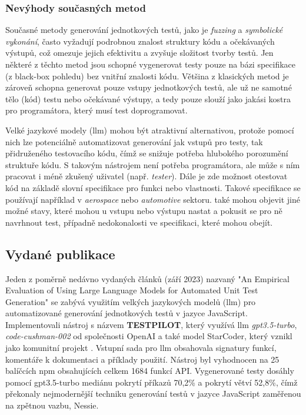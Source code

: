 \documentclass[czech, ma, kiv, he, iso690numb, pdf, viewonly]{fasthesis}
\begin{document}
        \subsubsection{Nevýhody současných metod}
        Současné metody generování jednotkových testů, jako je \textit{fuzzing} a \textit{symbolické vykonání}, často vyžadují podrobnou znalost struktury kódu a očekávaných výstupů, což omezuje jejich efektivitu a zvyšuje složitost tvorby testů. Jen některé z těchto metod jsou schopné vygenerovat testy pouze na bázi specifikace (z black-box pohledu) bez vnitřní znalosti kódu. Většina z klasických metod je zároveň schopna generovat pouze vstupy jednotkových testů, ale už ne samotné tělo (kód) testu nebo očekávané výstupy, a tedy pouze slouží jako jakási kostra pro programátora, který musí test doprogramovat.

        Velké jazykové modely (\gls{llm}) mohou být atraktivní alternativou, protože pomocí nich lze potenciálně automatizovat generování jak vstupů pro testy, tak přidruženého testovacího kódu, čímž se snižuje potřeba hlubokého porozumění struktuře kódu. S takovým nástrojem není potřeba programátora, ale může s ním pracovat i méně zkušený uživatel (např. \textit{tester}). Dále je zde možnost otestovat kód na základě slovní specifikace pro funkci nebo vlastnosti. Takové specifikace se používají například v \textit{aerospace} nebo \textit{automotive} sektoru. \cite{KuglerMaag2024SysReqAnalysis}  také mohou objevit jiné možné stavy, které mohou u vstupu nebo výstupu nastat a pokusit se pro ně navrhnout test, případně nedokonalosti ve specifikaci, které mohou obejít.

    \subsection{Vydané publikace}
    Jeden z poměrně nedávno vydaných článků (září 2023) nazvaný "An Empirical Evaluation of Using Large Language Models for Automated Unit Test Generation" \cite{schafer2023empirical} se zabývá využitím velkých jazykových modelů (\gls{llm}) pro automatizované generování jednotkových testů v jazyce JavaScript. Implementovali nástroj s názvem \textbf{TESTPILOT}, který využívá \gls{llm} \textit{gpt3.5-turbo}, \textit{code-cushman-002} od společnosti OpenAI a  také model StarCoder, který vznikl jako komunitní projekt \cite{StarCoder2023}. Vstupní sada pro \gls{llm} obsahovala signatury funkcí, komentáře k dokumentaci a příklady použití. Nástroj byl vyhodnocen na 25 balíčcích npm obsahujících celkem 1684 funkcí API. Vygenerované testy dosáhly pomocí gpt3.5-turbo mediánu pokrytí příkazů 70,2\% a pokrytí větví 52,8\%, čímž překonaly nejmodernější techniku generování testů v jazyce JavaScript zaměřenou na zpětnou vazbu, Nessie.
\end{document}
